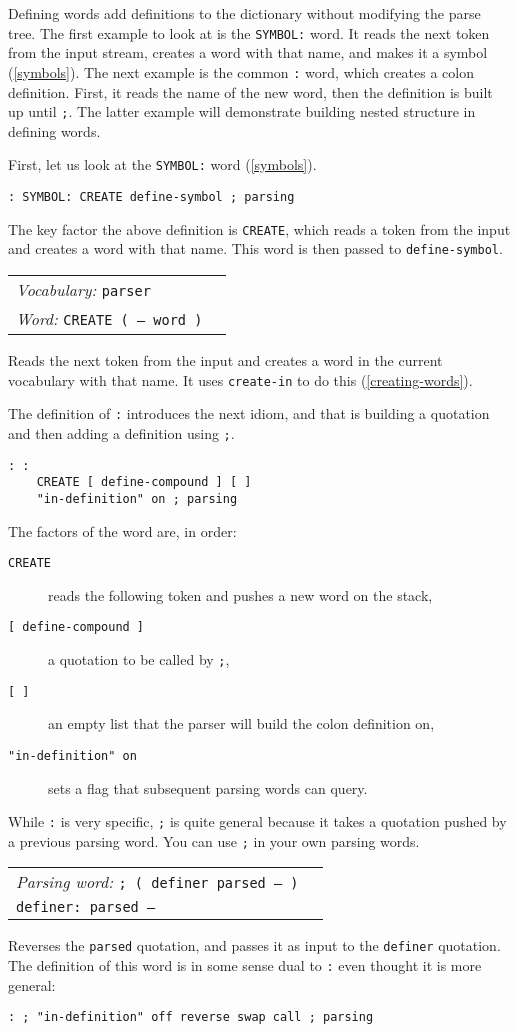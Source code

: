 \documentclass{book}
\newcommand{\vocabulary}[1]{\emph{Vocabulary:} \texttt{#1}&\\}
\newcommand{\parsingword}[2]{\index{\texttt{#1}}\emph{Parsing word:} \texttt{#2}&\\}
\newcommand{\ordinaryword}[2]{\index{\texttt{#1}}\emph{Word:} \texttt{#2}&\\}
\newcommand{\wordtable}[1]{

\begin{tabularx}{12cm}[t]{lX}
\hline
#1
\hline
\end{tabularx}

}
\begin{document}
Defining words add definitions to the dictionary without modifying the parse tree.
The first example to look at is the \verb|SYMBOL:| word. It reads the next token from the input stream, creates a word with that name, and makes it a symbol (\ref{symbols}). The next
example is the common \verb|:| word, which creates a colon definition. First, it reads the
name of the new word, then the definition is built up until \verb|;|. The latter
example will demonstrate building nested structure in defining words.

First, let us look at the \verb|SYMBOL:| word (\ref{symbols}).
\begin{verbatim}
: SYMBOL: CREATE define-symbol ; parsing
\end{verbatim}
The key factor the above definition is \verb|CREATE|, which reads a token from the input and creates a word with that name. This word is then passed to \verb|define-symbol|.

\wordtable{
\vocabulary{parser}
\ordinaryword{CREATE}{CREATE ( -- word )}
}
Reads the next token from the input and creates a word in the current vocabulary with that name. It uses \verb|create-in| to do this (\ref{creating-words}).

The definition of \verb|:| introduces the next idiom, and that is building a quotation and then adding a definition using \verb|;|.
\begin{verbatim}
: :
    CREATE [ define-compound ] [ ]
    "in-definition" on ; parsing
\end{verbatim}
The factors of the word are, in order:
\begin{description}
\item[\texttt{CREATE}] reads the following token and pushes a new word on the stack,
\item[\texttt{[ define-compound ]}] a quotation to be called by \verb|;|,
\item[\texttt{[ ]}] an empty list that the parser will build the colon definition on,
\item[\texttt{"in-definition" on}] sets a flag that subsequent parsing words can query.
\end{description}
While \verb|:| is very specific, \verb|;| is quite general because it takes a quotation pushed by a previous parsing word. You can use \verb|;| in your own parsing words.

\wordtable{
\parsingword{;}{;~( definer parsed -- )}
\texttt{definer:~parsed --}\\
}
Reverses the \verb|parsed| quotation, and passes it as input to the \verb|definer| quotation.
The definition of this word is in some sense dual to \verb|:| even thought it is more general:
\begin{verbatim}
: ; "in-definition" off reverse swap call ; parsing
\end{verbatim}
\end{document}
